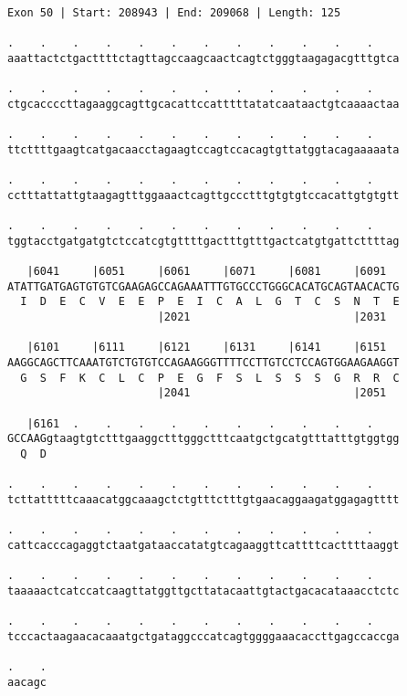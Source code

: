 \documentclass{article}
\begin{document}
\begin{Verbatim}[fontfamily=courier]
Exon 50 | Start: 208943 | End: 209068 | Length: 125

.    .    .    .    .    .    .    .    .    .    .    .    
aaattactctgacttttctagttagccaagcaactcagtctgggtaagagacgtttgtca

.    .    .    .    .    .    .    .    .    .    .    .    
ctgcaccccttagaaggcagttgcacattccatttttatatcaataactgtcaaaactaa

.    .    .    .    .    .    .    .    .    .    .    .    
ttcttttgaagtcatgacaacctagaagtccagtccacagtgttatggtacagaaaaata

.    .    .    .    .    .    .    .    .    .    .    .    
cctttattattgtaagagtttggaaactcagttgccctttgtgtgtccacattgtgtgtt

.    .    .    .    .    .    .    .    .    .    .    .    
tggtacctgatgatgtctccatcgtgttttgactttgtttgactcatgtgattcttttag

   |6041     |6051     |6061     |6071     |6081     |6091  
ATATTGATGAGTGTGTCGAAGAGCCAGAAATTTGTGCCCTGGGCACATGCAGTAACACTG
  I  D  E  C  V  E  E  P  E  I  C  A  L  G  T  C  S  N  T  E
                       |2021                         |2031  

   |6101     |6111     |6121     |6131     |6141     |6151  
AAGGCAGCTTCAAATGTCTGTGTCCAGAAGGGTTTTCCTTGTCCTCCAGTGGAAGAAGGT
  G  S  F  K  C  L  C  P  E  G  F  S  L  S  S  S  G  R  R  C
                       |2041                         |2051  

   |6161  .    .    .    .    .    .    .    .    .    .    
GCCAAGgtaagtgtctttgaaggctttgggctttcaatgctgcatgtttatttgtggtgg
  Q  D                                                      

.    .    .    .    .    .    .    .    .    .    .    .    
tcttatttttcaaacatggcaaagctctgtttctttgtgaacaggaagatggagagtttt

.    .    .    .    .    .    .    .    .    .    .    .    
cattcacccagaggtctaatgataaccatatgtcagaaggttcattttcacttttaaggt

.    .    .    .    .    .    .    .    .    .    .    .    
taaaaactcatccatcaagttatggttgcttatacaattgtactgacacataaacctctc

.    .    .    .    .    .    .    .    .    .    .    .    
tcccactaagaacacaaatgctgataggcccatcagtggggaaacaccttgagccaccga

.    .
aacagc
\end{Verbatim}
\newpage
\end{document}
